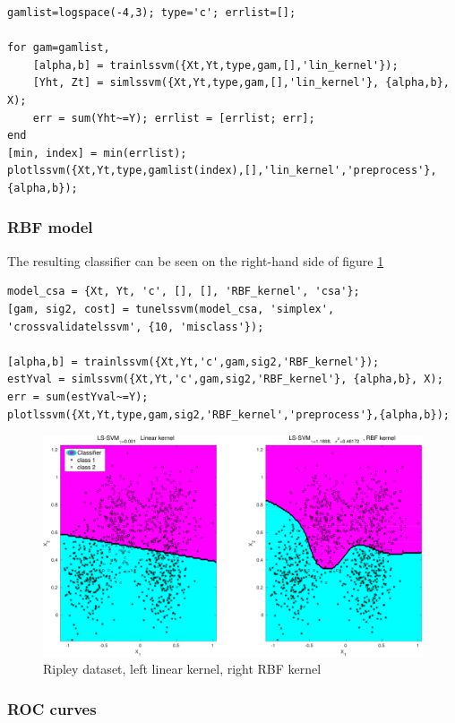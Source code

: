 \documentclass[11pt, a4paper]{article}
\begin{document}
\begin{lstlisting}
gamlist=logspace(-4,3); type='c'; errlist=[];

for gam=gamlist,
    [alpha,b] = trainlssvm({Xt,Yt,type,gam,[],'lin_kernel'});
    [Yht, Zt] = simlssvm({Xt,Yt,type,gam,[],'lin_kernel'}, {alpha,b}, X);
    err = sum(Yht~=Y); errlist = [errlist; err];
end
[min, index] = min(errlist);
plotlssvm({Xt,Yt,type,gamlist(index),[],'lin_kernel','preprocess'},{alpha,b});
\end{lstlisting}

\subsubsection{RBF model}

The resulting classifier can be seen on the right-hand side of figure
\ref{fig:ripley_lin_rbf}

\begin{lstlisting}
model_csa = {Xt, Yt, 'c', [], [], 'RBF_kernel', 'csa'};
[gam, sig2, cost] = tunelssvm(model_csa, 'simplex', 'crossvalidatelssvm', {10, 'misclass'});

[alpha,b] = trainlssvm({Xt,Yt,'c',gam,sig2,'RBF_kernel'});
estYval = simlssvm({Xt,Yt,'c',gam,sig2,'RBF_kernel'}, {alpha,b}, X);
err = sum(estYval~=Y);
plotlssvm({Xt,Yt,type,gam,sig2,'RBF_kernel','preprocess'},{alpha,b});
\end{lstlisting}

\begin{figure}[H]
    \centering
    \includegraphics[scale=.40]{ripley_lin_RBF.pdf}
    \caption{Ripley dataset, left linear kernel, right RBF kernel}
    \label{fig:ripley_lin_rbf}
\end{figure}

\subsubsection{ROC curves}
\end{document}
